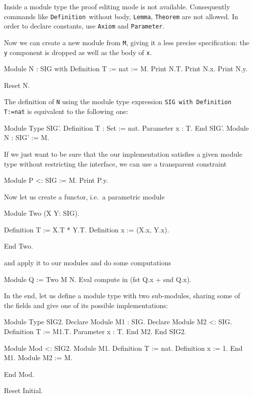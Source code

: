 \noindent
Inside a module type the proof editing mode is not available.
Consequently commands like \texttt{Definition}\ without body,
\texttt{Lemma}, \texttt{Theorem} are not allowed.  In order to declare
constants, use \texttt{Axiom} and \texttt{Parameter}.

Now we can create a new module from \texttt{M}, giving it a less
precise specification: the \texttt{y} component is dropped as well
as the body of \texttt{x}.

\begin{coq_example}
Module N : SIG with Definition T := nat := M.
Print N.T.
Print N.x.
Print N.y.
\end{coq_example}
\begin{coq_eval}
Reset N.
\end{coq_eval}

\noindent
The definition of \texttt{N} using the module type expression
\texttt{SIG with Definition T:=nat} is equivalent to the following
one:

\begin{coq_example*}
Module Type SIG'.
Definition T : Set := nat.
Parameter x : T.
End SIG'.
Module N : SIG' := M.
\end{coq_example*}
If we just want to be sure that the our implementation satisfies a
given module type without restricting the interface, we can use a
transparent constraint
\begin{coq_example}
Module P <: SIG := M.
Print P.y.
\end{coq_example}
Now let us create a functor, i.e.\ a parametric module
\begin{coq_example}
Module Two (X Y: SIG).
\end{coq_example}
\begin{coq_example*}
Definition T := X.T * Y.T.
Definition x := (X.x, Y.x).
\end{coq_example*}
\begin{coq_example}
End Two.
\end{coq_example}
and apply it to our modules and do some computations
\begin{coq_example}
Module Q := Two M N.
Eval compute in (fst Q.x + snd Q.x).
\end{coq_example}
In the end, let us define a module type with two sub-modules, sharing
some of the fields and give one of its possible implementations:
\begin{coq_example}
Module Type SIG2.
Declare Module M1 : SIG.
Declare Module M2 <: SIG.
Definition T := M1.T.
Parameter x : T.
End M2.
End SIG2.
\end{coq_example}
\begin{coq_example*}
Module Mod <: SIG2.
Module M1.
Definition T := nat.
Definition x := 1.
End M1.
Module M2 := M.
\end{coq_example*}
\begin{coq_example}
End Mod.
\end{coq_example}
\begin{coq_eval}
Reset Initial.
\end{coq_eval}

